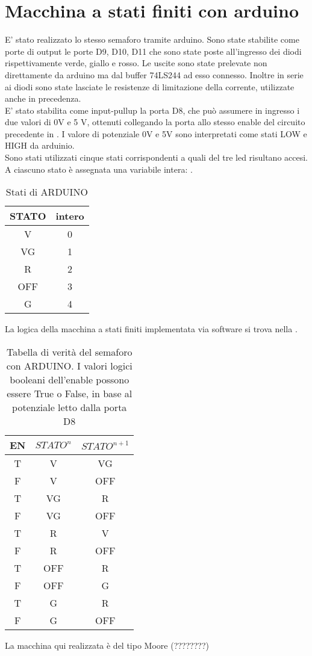 \section{Macchina a stati finiti con arduino}
E' stato realizzato lo stesso semaforo tramite arduino.
Sono state stabilite come porte di output le porte D9, D10, D11 che sono state poste all'ingresso dei diodi rispettivamente verde, giallo e rosso. Le uscite sono state prelevate non direttamente da arduino ma dal buffer 74LS244 ad esso connesso. Inoltre in serie ai diodi sono state lasciate le resistenze di limitazione della corrente, utilizzate anche in precedenza.\\
E' stato stabilita come input-pullup la porta D8, che può assumere in ingresso i due valori di 0V e 5 V, ottenuti collegando la porta allo stesso enable del circuito precedente in . I valore di potenziale  0V e 5V sono interpretati come stati LOW e HIGH da arduinio.\\ 
Sono stati utilizzati cinque stati corrispondenti a quali del tre led risultano accesi. A ciascuno stato è assegnata una variabile intera: .
\begin{table}[h]
	\centering
	\begin{tabular}{cc}		
		 STATO& intero\\
		 \midrule 
		 V & 0\\
		VG & 1\\
		R &  2\\
		OFF & 3\\
		G & 4\\ 
		          
 	\end{tabular}
	\caption{ Stati di ARDUINO }
	\label{t:stati_arduino}
\end{table}
La logica della macchina a stati finiti implementata via software si trova nella .
\begin{table}[h]
	\centering
	\begin{tabular}{ccc}		
		 EN& $STATO^{n}$& $STATO^{n+1}$\\
		 \midrule 
		 T & V &  VG\\
		 F & V & OFF\\
		 T & VG & R\\
		 F & VG & OFF\\
		 T & R & V\\
		 F & R & OFF\\
		 T & OFF & R\\
		 F & OFF & G\\
		 T & G & R\\
		 F & G & OFF\\
		          
 	\end{tabular}
	\caption{ Tabella di verità del semaforo con ARDUINO. I valori logici booleani dell'enable possono essere True o False, in base al potenziale letto dalla porta D8 }
	\label{t:semaforo_arduino}
\end{table}

La macchina qui realizzata è del tipo Moore (????????)

